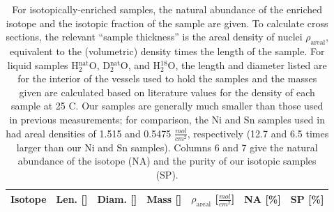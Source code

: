 \documentclass[twocolumn,secnumarabic,amssymb, nobibnotes, aps, prl,
superscriptaddress, nobalancelastpage]{revtex4}
\newcommand{\tot}{\ensuremath{\sigma_{tot}}}
\begin{document}
\begin{table}[tb]
    \caption[Physical characteristics of samples used for neutron \tot\
    measurements]
    {
        For isotopically-enriched samples, the natural abundance
        of the enriched isotope and the isotopic fraction of the sample are
        given. To calculate cross sections, the relevant ``sample thickness'' is the areal
        density of nuclei $\rho_{\text{areal}}$, equivalent to
        the (volumetric) density times the length of the sample. For liquid
        samples H$_{2}^{\text{nat}}$O, D$_{2}^{\text{nat}}$O, and H$_{2}^{18}$O,
        the length and diameter listed are for the interior of the vessels
        used to hold the samples and the masses given are calculated based on 
        literature values for the density of each sample at 25 C.
        Our samples are generally much smaller than those used in previous
        measurements; for comparison, the Ni and Sn samples used in \cite{Abfalterer2001,
        Finlay1993} had areal densities of 1.515 and 0.5475
        $\frac{mol}{cm^{2}}$, respectively (12.7 and 6.5 times larger than our
        Ni and Sn samples). Columns 6 and 7 give the natural abundance of the
        isotope (NA) and the purity of our isotopic samples (SP).
    }
    \label{SampleCharacteristics}
    \begin{center}
        \begin{tabular}{ c c c c c c c }
            \hline
            Isotope & Len. [\milli\meter] & Diam. [\milli\meter]
            & Mass [\gram] & $\rho_{\text{areal}}$
            [$\frac{mol}{cm^{2}}$] & NA [\%] & SP 
            [\%]\\
            \hline


\end{tabular}
\end{center}
\end{table}
\end{document}
